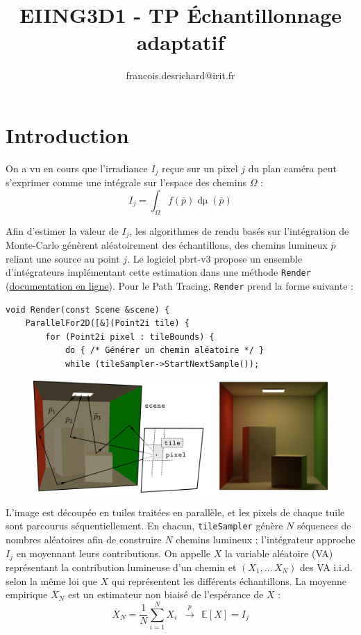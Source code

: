 \documentclass{article}
\title{EIING3D1 - TP Échantillonnage adaptatif\hidden{\\Version stylo rouge}}
\author{francois.desrichard@irit.fr}
\date{}
\newcommand{\diff}[1]{\mathop{\mathrm{d}#1}}
\newcommand{\esp}[1]{\mathbb{E}[#1]}
\newcommand{\link}[2]{\href{#1}{\color[rgb]{0, 0, 1}#2}}
\begin{document}
\maketitle


\section{Introduction}
On a vu en cours que l'irradiance $I_j$ reçue sur un pixel $j$ du plan caméra peut s'exprimer comme une intégrale sur l'espace des chemins $\Omega$ :%
%
\begin{equation*}
    I_j = \int_\Omega f(\bar{p}) \diff{\mu}(\bar{p})
\end{equation*}

Afin d'estimer la valeur de $I_j$, les algorithmes de rendu basés sur l'intégration de Monte-Carlo génèrent aléatoirement des échantillons, des chemins lumineux $\bar{p}$ reliant une source au point $j$.
Le logiciel pbrt-v3 propose un ensemble d'intégrateurs implémentant cette estimation dans une méthode \texttt{Render} (\link{http://www.pbr-book.org/3ed-2018/Introduction/pbrt_System_Overview.html\#Integrator}{documentation en ligne}).
Pour le Path Tracing, \texttt{Render} prend la forme suivante :%
%
\begin{lstlisting}
void Render(const Scene &scene) {
    ParallelFor2D([&](Point2i tile) {
        for (Point2i pixel : tileBounds) {
            do { /* Générer un chemin aléatoire */ }
            while (tileSampler->StartNextSample());
\end{lstlisting}

\begin{figure}
    \centering
    \includegraphics[width=\linewidth]{render_loop}
\end{figure}

L'image est découpée en tuiles traitées en parallèle, et les pixels de chaque tuile sont parcourus séquentiellement.
En chacun, \texttt{tileSampler} génère $N$ séquences de nombres aléatoires afin de construire $N$ chemins lumineux ; l'intégrateur approche $I_j$ en moyennant leurs contributions.
On appelle $X$ la variable aléatoire (VA) représentant la contribution lumineuse d'un chemin et $(X_1, \ldots\, X_N)$ des VA i.i.d. selon la même loi que $X$ qui représentent les différents échantillons.
La moyenne empirique $\overline{X}_N$ est un estimateur non biaisé de l'espérance de $X$ :%
%
\begin{equation*}
    \overline{X}_N = \frac{1}{N} \sum_{i = 1}^{N} X_i
    \:\;\xrightarrow{p}\:\: \esp{X} = I_j
\end{equation*}
\end{document}
